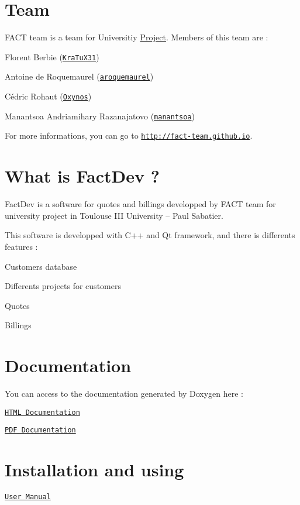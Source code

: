 \section*{Team}

F\+A\+C\+T team is a team for Universitiy \hyperlink{classProject}{Project}. Members of this team are \+:
\begin{DoxyItemize}
\item Florent Berbie (\href{https://github.com/KraTuX31 KraTuX31}{\tt Kra\+Tu\+X31})
\item Antoine de Roquemaurel (\href{https://github.com/aroquemaurel}{\tt aroquemaurel})
\item Cédric Rohaut (\href{https://github.com/Oxynos}{\tt Oxynos})
\item Manantsoa Andriamihary Razanajatovo (\href{https://github.com/manantsoa}{\tt manantsoa})
\end{DoxyItemize}

For more informations, you can go to \href{http://fact-team.github.io}{\tt http\+://fact-\/team.\+github.\+io}.

\section*{What is Fact\+Dev ?}



Fact\+Dev is a software for quotes and billings developped by F\+A\+C\+T team for university project in Toulouse I\+I\+I University – Paul Sabatier.

This software is developped with C++ and Qt framework, and there is differents features \+:
\begin{DoxyItemize}
\item Customers database
\item Differents projects for customers
\item Quotes
\item Billings
\end{DoxyItemize}

\section*{Documentation}

You can access to the documentation generated by Doxygen here \+:
\begin{DoxyItemize}
\item \href{http://fact-team.github.io/doc/html/index.html}{\tt H\+T\+M\+L Documentation}
\item \href{http://fact-team.github.io/doc/latex/refman.pdf}{\tt P\+D\+F Documentation}
\end{DoxyItemize}

\section*{Installation and using}


\begin{DoxyItemize}
\item \href{http://fact-team.github.io/doc/usermanual.pdf}{\tt User Manual} 
\end{DoxyItemize}